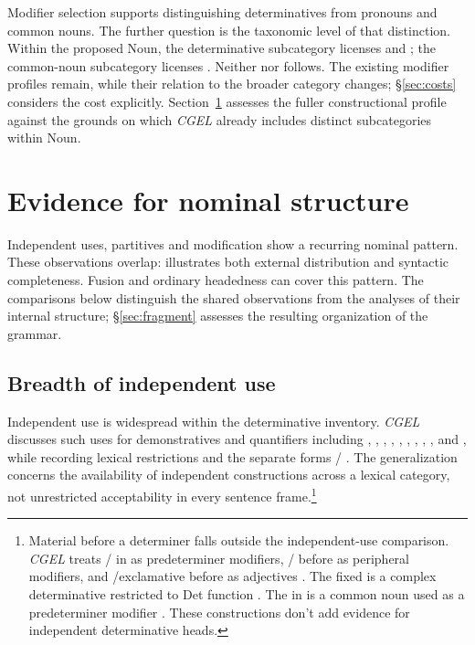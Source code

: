 \documentclass[12pt]{article}
\begin{document}
Modifier selection supports distinguishing determinatives from pronouns and common nouns. The further question is the taxonomic level of that distinction. Within the proposed Noun, the determinative subcategory licenses  and ; the common-noun subcategory licenses . Neither  nor  follows. The existing modifier profiles remain, while their relation to the broader category changes; §\ref{sec:costs} considers the cost explicitly. Section~\ref{sec:evidence} assesses the fuller constructional profile against the grounds on which \textit{CGEL} already includes distinct subcategories within Noun.

\section{Evidence for nominal structure}\label{sec:evidence}

Independent uses, partitives and modification show a recurring nominal pattern. These observations overlap:  illustrates both external distribution and syntactic completeness. Fusion and ordinary headedness can cover this pattern. The comparisons below distinguish the shared observations from the analyses of their internal structure; §\ref{sec:fragment} assesses the resulting organization of the grammar.

\subsection{Breadth of independent use}\label{sec:independent}

Independent use is widespread within the determinative inventory. \textit{CGEL} discusses such uses for demonstratives and quantifiers including , , , , , , , , ,  and , while recording lexical restrictions and the separate forms / \citep[371--372, 410--424]{huddleston2002}. The generalization concerns the availability of independent constructions across a lexical category, not unrestricted acceptability in every sentence frame.\footnote{Material before a determiner falls outside the independent-use comparison. \textit{CGEL} treats / in  as predeterminer modifiers, / before  as peripheral modifiers, and /exclamative  before  as adjectives \citep[433--437]{huddleston2002}. The fixed  is a complex determinative restricted to Det function \citep[394]{huddleston2002}. The  in  is a common noun used as a predeterminer modifier \citep[434]{huddleston2002}. These constructions don't add evidence for independent determinative heads.}
\end{document}
